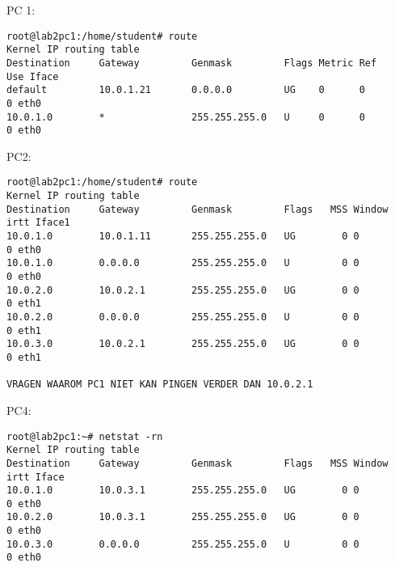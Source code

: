 PC 1:
\begin{lstlisting}
root@lab2pc1:/home/student# route
Kernel IP routing table
Destination     Gateway         Genmask         Flags Metric Ref    Use Iface
default         10.0.1.21       0.0.0.0         UG    0      0        0 eth0
10.0.1.0        *               255.255.255.0   U     0      0        0 eth0
\end{lstlisting}

PC2:
\begin{lstlisting}
root@lab2pc1:/home/student# route
Kernel IP routing table
Destination     Gateway         Genmask         Flags   MSS Window  irtt Iface1
10.0.1.0        10.0.1.11       255.255.255.0   UG        0 0          0 eth0
10.0.1.0        0.0.0.0         255.255.255.0   U         0 0          0 eth0
10.0.2.0        10.0.2.1        255.255.255.0   UG        0 0          0 eth1
10.0.2.0        0.0.0.0         255.255.255.0   U         0 0          0 eth1
10.0.3.0        10.0.2.1        255.255.255.0   UG        0 0          0 eth1

VRAGEN WAAROM PC1 NIET KAN PINGEN VERDER DAN 10.0.2.1
\end{lstlisting}

PC4:
\begin{lstlisting}
root@lab2pc1:~# netstat -rn
Kernel IP routing table
Destination     Gateway         Genmask         Flags   MSS Window  irtt Iface
10.0.1.0        10.0.3.1        255.255.255.0   UG        0 0          0 eth0
10.0.2.0        10.0.3.1        255.255.255.0   UG        0 0          0 eth0
10.0.3.0        0.0.0.0         255.255.255.0   U         0 0          0 eth0
\end{lstlisting}
